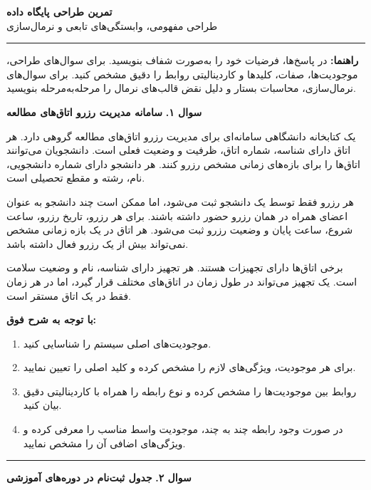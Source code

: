 \documentclass[12pt,a4paper]{article}
\newcommand{\questiontitle}[2]{%
  \vspace{0.4em}
  \noindent
  \colorbox{boxgray}{%
    \parbox{\dimexpr\textwidth-2\fboxsep\relax}{%
      \textbf{سوال #1.} \hfill \textbf{#2}
    }%
  }
  \vspace{0.4em}
}
\newcommand{\subheading}[1]{%
  \vspace{0.35em}
  \textbf{#1}
  \vspace{0.15em}
}
\newcommand{\answerspace}[1]{%
  \vspace{0.35em}
  \noindent\textcolor{rulegray}{\rule{\textwidth}{0.5pt}}
  \vspace{#1}
}
\begin{document}
\begin{center}
  {\Huge \textbf{تمرین طراحی پایگاه داده}}\\[0.6em]
  {\large طراحی مفهومی، وابستگی‌های تابعی و نرمال‌سازی}\\[0.4em]
  \textcolor{rulegray}{\rule{0.72\textwidth}{0.6pt}}
\end{center}

\vspace{0.4em}

\begin{framed}
\textbf{راهنما:}
در پاسخ‌ها، فرضیات خود را به‌صورت شفاف بنویسید. برای سوال‌های طراحی، موجودیت‌ها، صفات، کلیدها و کاردینالیتی روابط را دقیق مشخص کنید. برای سوال‌های نرمال‌سازی، محاسبات بستار و دلیل نقض قالب‌های نرمال را مرحله‌به‌مرحله بنویسید.
\end{framed}

\questiontitle{۱}{سامانه مدیریت رزرو اتاق‌های مطالعه}

یک کتابخانه دانشگاهی سامانه‌ای برای مدیریت رزرو اتاق‌های مطالعه گروهی دارد. هر اتاق دارای شناسه، شماره اتاق، ظرفیت و وضعیت فعلی است. دانشجویان می‌توانند اتاق‌ها را برای بازه‌های زمانی مشخص رزرو کنند. هر دانشجو دارای شماره دانشجویی، نام، رشته و مقطع تحصیلی است.

هر رزرو فقط توسط یک دانشجو ثبت می‌شود، اما ممکن است چند دانشجو به عنوان اعضای همراه در همان رزرو حضور داشته باشند. برای هر رزرو، تاریخ رزرو، ساعت شروع، ساعت پایان و وضعیت رزرو ثبت می‌شود. هر اتاق در یک بازه زمانی مشخص نمی‌تواند بیش از یک رزرو فعال داشته باشد.

برخی اتاق‌ها دارای تجهیزات هستند. هر تجهیز دارای شناسه، نام و وضعیت سلامت است. یک تجهیز می‌تواند در طول زمان در اتاق‌های مختلف قرار گیرد، اما در هر زمان فقط در یک اتاق مستقر است.

\subheading{با توجه به شرح فوق:}
\begin{enumerate}
\item موجودیت‌های اصلی سیستم را شناسایی کنید.
\item برای هر موجودیت، ویژگی‌های لازم را مشخص کرده و کلید اصلی را تعیین نمایید.
\item روابط بین موجودیت‌ها را مشخص کرده و نوع رابطه را همراه با کاردینالیتی دقیق بیان کنید.
\item در صورت وجود رابطه چند به چند، موجودیت واسط مناسب را معرفی کرده و ویژگی‌های اضافی آن را مشخص نمایید.
\end{enumerate}

\answerspace{7.4cm}

\newpage

\questiontitle{۲}{جدول ثبت‌نام در دوره‌های آموزشی}
\end{document}
